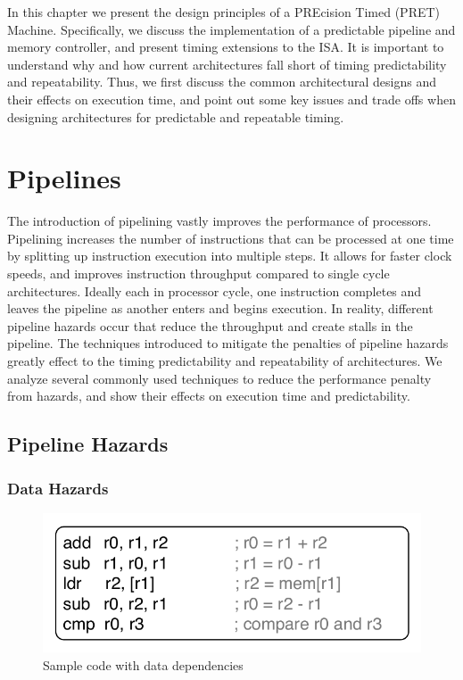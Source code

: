 In this chapter we present the design principles of a PREcision Timed (PRET) Machine.
Specifically, we discuss the implementation of a predictable pipeline and memory controller, and present timing extensions to the ISA. 
It is important to understand why and how current architectures fall short of timing predictability and repeatability.
Thus, we first discuss the common architectural designs and their effects on execution time, and point out some key issues and trade offs when designing architectures for predictable and repeatable timing.

\section{Pipelines}
The introduction of pipelining vastly improves the performance of processors.
Pipelining increases the number of instructions that can be processed at one time by splitting up instruction execution into multiple steps.
It allows for faster clock speeds, and improves instruction throughput compared to single cycle architectures.
Ideally each in processor cycle, one instruction completes and leaves the pipeline as another enters and begins execution. 
In reality, different pipeline hazards occur that reduce the throughput and create stalls in the pipeline.
The techniques introduced to mitigate the penalties of pipeline hazards greatly effect to the timing predictability and repeatability of architectures.     
We analyze several commonly used techniques to reduce the performance penalty from hazards, and show their effects on execution time and predictability. 

\subsection{Pipeline Hazards}
\label{sec:pipeline_hazards}
\subsubsection{Data Hazards}

\begin{figure}
  \vspace{-30pt}
  \begin{center}
    \includegraphics[scale=.65]{figs/sample_data_dependent_code}
  \end{center}
  \vspace{-3mm}
  \caption{Sample code with data dependencies}
  \label{fig:sample_data_dependent_code}
\end{figure}


